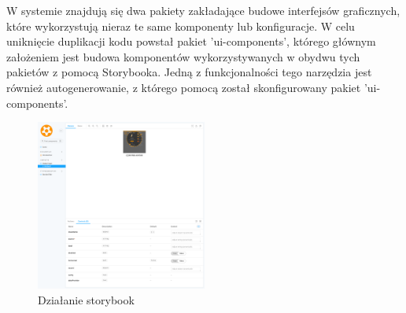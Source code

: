 W systemie znajdują się dwa pakiety zakładające budowe interfejsów graficznych, które wykorzystują nieraz te same komponenty lub konfiguracje. W celu uniknięcie duplikacji kodu powstał pakiet 'ui-components', którego głównym założeniem jest budowa komponentów wykorzystywanych w obydwu tych pakietów z pomocą Storybooka. Jedną z funkcjonalności tego narzędzia jest również autogenerowanie, z którego pomocą został skonfigurowany pakiet 'ui-components'. 

\begin{figure}[h!]
    \centering
    \includegraphics[width=0.5\textwidth]{images/ui-components/storybook.png}
    \caption{Działanie storybook}
    \label{fig:mobile}
\end{figure}
